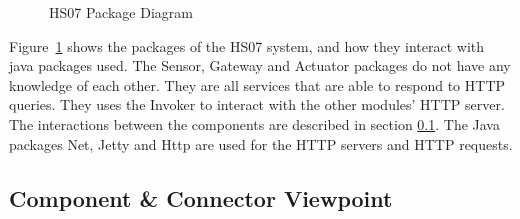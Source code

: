 \documentclass[a4paper,10pt]{article}
\begin{document}
\begin{figure}[!htb]
\caption{HS07 Package Diagram}
\label{fig:mv}
\end{figure}

Figure~\ref{fig:mv} shows the packages of the HS07 system, and how they interact 
with java packages used. The Sensor, Gateway and Actuator packages do not have
any knowledge of each other. They are all services that are able to respond to
HTTP queries. They uses the Invoker to interact with the other modules' HTTP
server. The interactions between the components are described in section
\ref{sec:component}. The Java packages Net, Jetty and Http are used for the
HTTP servers and HTTP requests.

\subsection{Component \& Connector Viewpoint}
\label{sec:component}
\end{document}
